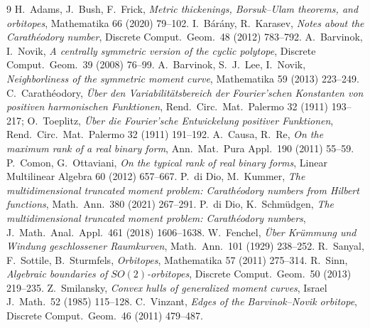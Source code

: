 \documentclass[11pt]{amsart}
\theoremstyle{remark}
\begin{document}
\begin{thebibliography}{9}
 H.~Adams, J.~Bush, F.~Frick, \emph{Metric thickenings, Borsuk--Ulam theorems, and orbitopes}, Mathematika 66 (2020) 79--102.
 I.~B\'ar\'any, R.~Karasev, \emph{Notes about the Carath\'eodory number}, Discrete Comput.\ Geom.\ 48 (2012) 783--792.
 A.~Barvinok, I.~Novik, \emph{A centrally symmetric version of the cyclic polytope}, Discrete Comput.\ Geom.\ 39 (2008) 76--99.
 A.~Barvinok, S.~J.~Lee, I.~Novik, \emph{Neighborliness of the symmetric moment curve}, Mathematika 59 (2013) 223--249.
 C.~Carath\'eodory, \emph{\"Uber den Variabilit\"atsbereich der Fourier'schen Konstanten von positiven harmonischen Funktionen}, Rend.\ Circ.\ Mat.\ Palermo 32 (1911) 193--217;
O.~Toeplitz, \emph{\"Uber die Fourier'sche Entwickelung positiver Funktionen}, Rend.\ Circ.\ Mat.\ Palermo 32 (1911) 191--192.
 A.~Causa, R.~Re, \emph{On the maximum rank of a real binary form}, Ann.\ Mat.\ Pura Appl.\ 190 (2011) 55--59.
 P.~Comon, G.~Ottaviani, \emph{On the typical rank of real binary forms}, Linear Multilinear Algebra 60 (2012) 657--667.
 P.~di Dio, M.~Kummer, \emph{The multidimensional truncated moment problem: Carath\'eodory numbers from Hilbert functions}, Math.\ Ann.\ 380 (2021) 267--291.
 P.~di Dio, K.~Schm\"udgen, \emph{The multidimensional truncated moment problem: Carath\'eodory numbers}, J.\ Math.\ Anal.\ Appl.\ 461 (2018) 1606--1638.
 W.~Fenchel, \emph{\"Uber Kr\"ummung und Windung geschlossener Raumkurven}, Math.\ Ann.\ 101 (1929) 238--252.
 R.~Sanyal, F.~Sottile, B.~Sturmfels, \emph{Orbitopes}, Mathematika 57 (2011) 275--314.
 R.~Sinn, \emph{Algebraic boundaries of $SO(2)$-orbitopes}, Discrete Comput.\ Geom.\ 50 (2013) 219--235.
 Z.~Smilansky, \emph{Convex hulls of generalized moment curves}, Israel J.\ Math.\ 52 (1985) 115--128.
 C.~Vinzant, \emph{Edges of the Barvinok--Novik orbitope}, Discrete Comput.\ Geom.\ 46 (2011) 479--487.
\end{thebibliography}
\end{document}
